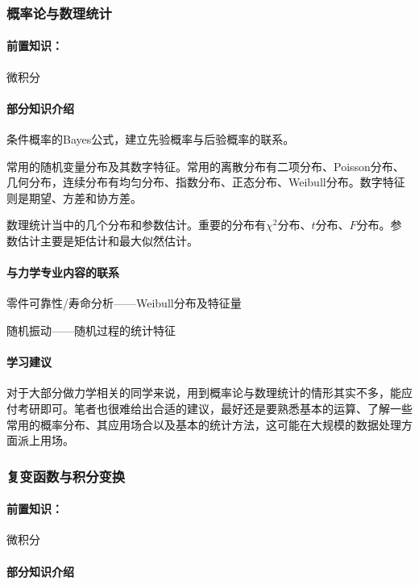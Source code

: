 \subsubsection{概率论与数理统计}

\paragraph{前置知识：}微积分

\paragraph{部分知识介绍}

条件概率的Bayes公式，建立先验概率与后验概率的联系。

常用的随机变量分布及其数字特征。常用的离散分布有二项分布、Poisson分布、几何分布，连续分布有均匀分布、指数分布、正态分布、Weibull分布。数字特征则是期望、方差和协方差。

数理统计当中的几个分布和参数估计。重要的分布有$\chi^2$分布、$t$分布、$F$分布。参数估计主要是矩估计和最大似然估计。

\paragraph{与力学专业内容的联系}

零件可靠性/寿命分析——Weibull分布及特征量

随机振动——随机过程的统计特征

\paragraph{学习建议}

对于大部分做力学相关的同学来说，用到概率论与数理统计的情形其实不多，能应付考研即可。笔者也很难给出合适的建议，最好还是要熟悉基本的运算、了解一些常用的概率分布、其应用场合以及基本的统计方法，这可能在大规模的数据处理方面派上用场。

\subsubsection{复变函数与积分变换}

\paragraph{前置知识：}微积分

\paragraph{部分知识介绍}


